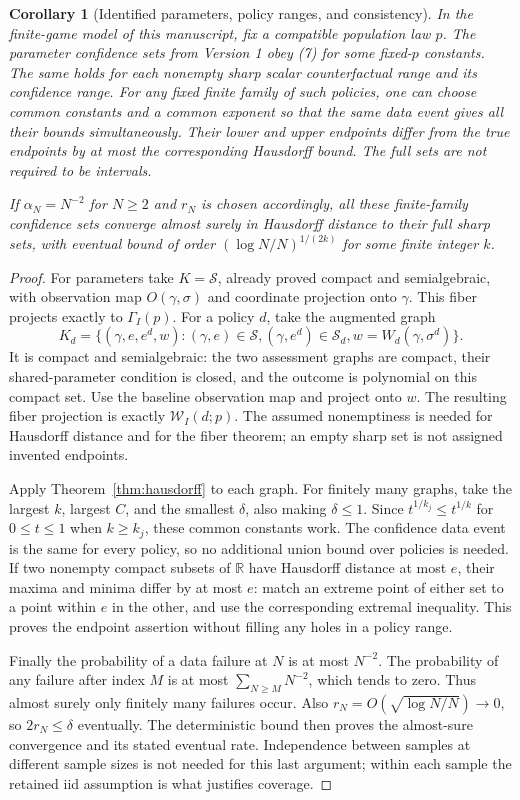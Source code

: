 \documentclass[11pt]{article}
\newtheorem{corollary}[theorem]{Corollary}
\theoremstyle{remark}\newtheorem{remark}[theorem]{Remark}
\begin{document}
\begin{corollary}[Identified parameters, policy ranges, and consistency]
\label{cor:application}
In the finite-game model of this manuscript, fix a compatible population
law $p$. The parameter confidence sets from Version 1 obey (7) for some
fixed-$p$ constants. The same holds for each nonempty sharp scalar
counterfactual range and its confidence range. For any fixed finite family
of such policies, one can choose common constants and a common exponent
so that the same data event gives all their bounds simultaneously. Their
lower and upper endpoints differ from the true endpoints by at most the
corresponding Hausdorff bound. The full sets are not required to be
intervals.

If $\alpha_N=N^{-2}$ for $N\geq2$ and $r_N$ is chosen accordingly, all
these finite-family confidence sets converge almost surely in Hausdorff
distance to their full sharp sets, with eventual bound of order
$(\log N/N)^{1/(2k)}$ for some finite integer $k$.
\end{corollary}
\begin{proof}
For parameters take $K=\mathcal S$, already proved compact and
semialgebraic, with observation map $O(\gamma,\sigma)$ and coordinate
projection onto $\gamma$. This fiber projects exactly to $\Gamma_I(p)$.
For a policy $d$, take the augmented graph
\[
 K_d=\{(\gamma,e,e^d,w):(\gamma,e)\in\mathcal S,
         (\gamma,e^d)\in\mathcal S_d,
                  w=W_d(\gamma,\sigma^d)\}.
\]
It is compact and semialgebraic: the two assessment graphs are compact,
their shared-parameter condition is closed, and the outcome is polynomial
on this compact set. Use the baseline observation map and project onto
$w$. The resulting fiber projection is exactly $\mathcal W_I(d;p)$.
The assumed nonemptiness is needed for Hausdorff distance and for the
fiber theorem; an empty sharp set is not assigned invented endpoints.

Apply Theorem~\ref{thm:hausdorff} to each graph. For finitely many graphs,
take the largest $k$, largest $C$, and the smallest $\delta$, also making
$\delta\leq1$. Since $t^{1/k_j}\leq t^{1/k}$ for $0\leq t\leq1$
when $k\geq k_j$, these common constants work. The confidence data event
is the same for every policy, so no additional union bound over policies
is needed. If two nonempty compact subsets of $\mathbb R$ have Hausdorff
distance at most $e$, their maxima and minima differ by at most $e$:
match an extreme point of either set to a point within $e$ in the other,
and use the corresponding extremal inequality. This proves the endpoint
assertion without filling any holes in a policy range.

Finally the probability of a data failure at $N$ is at most $N^{-2}$.
The probability of any failure after index $M$ is at most
$\sum_{N\geq M}N^{-2}$, which tends to zero. Thus almost surely only
finitely many failures occur. Also $r_N=O(\sqrt{\log N/N})\to0$, so
$2r_N\leq\delta$ eventually. The deterministic bound then proves the
almost-sure convergence and its stated eventual rate. Independence between
samples at different sample sizes is not needed for this last argument;
within each sample the retained iid assumption is what justifies coverage.
\end{proof}
\end{document}
